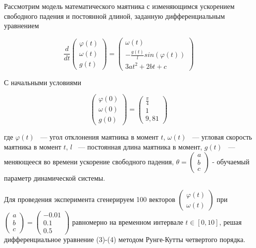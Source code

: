\documentclass[a4paper,14pt]{article}
\theoremstyle{plain} %
\theoremstyle{definition} %
\theoremstyle{remark} %
\begin{document}
        Рассмотрим модель математического маятника с изменяющимся ускорением свободного падения и постоянной длиной, заданную дифференциальным уравнением
        
        \begin{equation}
            \frac{d}{dt}
            \begin{pmatrix}
            \varphi(t) \\
            \omega(t) \\
            g(t)
            \end{pmatrix}
            =
            \begin{pmatrix}
            \omega(t) \\
             - \frac{g(t)}{l}sin(\varphi(t)) \\
            3at^2 + 2bt + c
            \end{pmatrix}
        \end{equation}

        С начальными условиями

        \begin{equation}
            \begin{pmatrix}
            \varphi(0) \\
            \omega(0) \\
            g(0)
            \end{pmatrix}
            =
            \begin{pmatrix}
            \frac{\pi}{4} \\
            1 \\
            9,81
            \end{pmatrix}
        \end{equation}

        где $\varphi(t)$ ~--- угол отклонения маятника в момент $t$, $\omega(t)$ ~--- угловая скорость маятника в момент $t$,
        $l$ ~--- постоянная длина маятника в момент, $g(t)$ ~--- меняющееся во времени ускорение свободного падения, $\theta = \begin{pmatrix} a \\ b \\ c\end{pmatrix}$ - обучаемый параметр динамической системы.

        Для проведения эксперимента сгенерируем 100 векторов $\begin{pmatrix} \varphi(t) \\ \omega(t) \end{pmatrix}$ при $\begin{pmatrix} a \\ b \\ c\end{pmatrix} = \begin{pmatrix} -0.01 \\ 0.1 \\ 0.5 \end{pmatrix}$ равномерно на временном интервале $t \in [0, 10]$, решая дифференциальное уравнение (3)-(4) методом Рунге-Кутты четвертого порядка.
\end{document}
